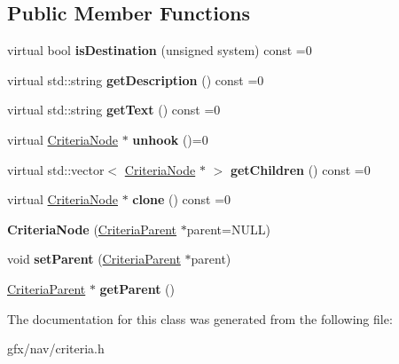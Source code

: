 \subsection*{Public Member Functions}
\begin{DoxyCompactItemize}
\item 
virtual bool {\bfseries is\+Destination} (unsigned system) const =0\hypertarget{classCriteriaNode_a8a5aedd6f9ff953369bef70c0435aa22}{}\label{classCriteriaNode_a8a5aedd6f9ff953369bef70c0435aa22}

\item 
virtual std\+::string {\bfseries get\+Description} () const =0\hypertarget{classCriteriaNode_a4add2fee39927ee0bce2227d2d3bbce0}{}\label{classCriteriaNode_a4add2fee39927ee0bce2227d2d3bbce0}

\item 
virtual std\+::string {\bfseries get\+Text} () const =0\hypertarget{classCriteriaNode_a2ebffd96aa74827325fa7baf68685700}{}\label{classCriteriaNode_a2ebffd96aa74827325fa7baf68685700}

\item 
virtual \hyperlink{classCriteriaNode}{Criteria\+Node} $\ast$ {\bfseries unhook} ()=0\hypertarget{classCriteriaNode_a2d3a4f4026b08a75a7245f1fdb3c5c59}{}\label{classCriteriaNode_a2d3a4f4026b08a75a7245f1fdb3c5c59}

\item 
virtual std\+::vector$<$ \hyperlink{classCriteriaNode}{Criteria\+Node} $\ast$ $>$ {\bfseries get\+Children} () const =0\hypertarget{classCriteriaNode_a6ee91db14e8720c70b66b750aee0b95e}{}\label{classCriteriaNode_a6ee91db14e8720c70b66b750aee0b95e}

\item 
virtual \hyperlink{classCriteriaNode}{Criteria\+Node} $\ast$ {\bfseries clone} () const =0\hypertarget{classCriteriaNode_af4a6f530c733f84c5f373f6e0ee28773}{}\label{classCriteriaNode_af4a6f530c733f84c5f373f6e0ee28773}

\item 
{\bfseries Criteria\+Node} (\hyperlink{classCriteriaParent}{Criteria\+Parent} $\ast$parent=N\+U\+LL)\hypertarget{classCriteriaNode_a2c7242d24aad74402285e76d29f4c311}{}\label{classCriteriaNode_a2c7242d24aad74402285e76d29f4c311}

\item 
void {\bfseries set\+Parent} (\hyperlink{classCriteriaParent}{Criteria\+Parent} $\ast$parent)\hypertarget{classCriteriaNode_ad899d65654190a38ec80f90b921b026b}{}\label{classCriteriaNode_ad899d65654190a38ec80f90b921b026b}

\item 
\hyperlink{classCriteriaParent}{Criteria\+Parent} $\ast$ {\bfseries get\+Parent} ()\hypertarget{classCriteriaNode_a18df42928d67f74acf51c64c8f2e1afb}{}\label{classCriteriaNode_a18df42928d67f74acf51c64c8f2e1afb}

\end{DoxyCompactItemize}


The documentation for this class was generated from the following file\+:\begin{DoxyCompactItemize}
\item 
gfx/nav/criteria.\+h\end{DoxyCompactItemize}
